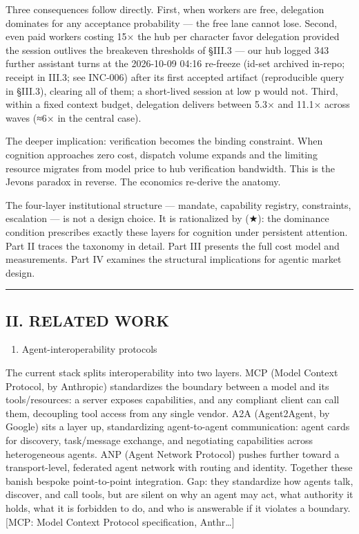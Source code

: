 \documentclass[
]{article}
\providecommand{\tightlist}{%
  \setlength{\itemsep}{0pt}\setlength{\parskip}{0pt}}
\begin{document}
Three consequences follow directly. First, when workers are free,
delegation dominates for any acceptance probability --- the free lane
cannot lose. Second, even paid workers costing 15× the hub per character
favor delegation provided the session outlives the breakeven thresholds
of §III.3 --- our hub logged 343 further assistant turns at the
2026-10-09 04:16 re-freeze (id-set archived in-repo; receipt in III.3;
see INC-006) after its first accepted artifact (reproducible query in
§III.3), clearing all of them; a short-lived session at low p would not.
Third, within a fixed context budget, delegation delivers between 5.3×
and 11.1× across waves (≈6× in the central case).

The deeper implication: verification becomes the binding constraint.
When cognition approaches zero cost, dispatch volume expands and the
limiting resource migrates from model price to hub verification
bandwidth. This is the Jevons paradox in reverse. The economics
re-derive the anatomy.

The four-layer institutional structure --- mandate, capability registry,
constraints, escalation --- is not a design choice. It is rationalized
by (★): the dominance condition prescribes exactly these layers for
cognition under persistent attention. Part II traces the taxonomy in
detail. Part III presents the full cost model and measurements. Part IV
examines the structural implications for agentic market design.

\begin{center}\rule{0.5\linewidth}{0.5pt}\end{center}

\subsection{II. RELATED WORK}\label{ii-related-work}

\begin{enumerate}
\def\labelenumi{\arabic{enumi}.}
\tightlist
\item
  Agent-interoperability protocols
\end{enumerate}

The current stack splits interoperability into two layers. MCP (Model
Context Protocol, by Anthropic) standardizes the boundary between a
model and its tools/resources: a server exposes capabilities, and any
compliant client can call them, decoupling tool access from any single
vendor. A2A (Agent2Agent, by Google) sits a layer up, standardizing
agent-to-agent communication: agent cards for discovery, task/message
exchange, and negotiating capabilities across heterogeneous agents. ANP
(Agent Network Protocol) pushes further toward a transport-level,
federated agent network with routing and identity. Together these banish
bespoke point-to-point integration. Gap: they standardize how agents
talk, discover, and call tools, but are silent on why an agent may act,
what authority it holds, what it is forbidden to do, and who is
answerable if it violates a boundary. {[}MCP: Model Context Protocol
specification, Anthr\ldots{]}
\end{document}
